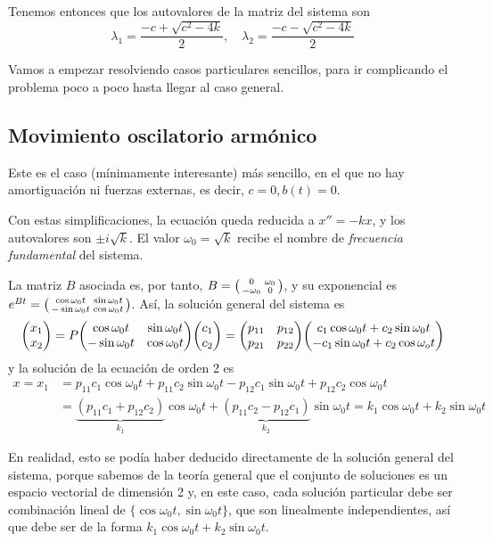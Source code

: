\documentclass[../ecuaciones_diferenciales.tex]{subfiles}
\begin{document}
Tenemos entonces que los autovalores de la matriz del sistema son
\[\lambda_1 = \frac{-c + \sqrt{c^2 - 4k}}{2}, \quad \lambda_2 = \frac{-c - \sqrt{c^2-4k}}{2}\]

Vamos a empezar resolviendo casos particulares sencillos, para ir complicando el
problema poco a poco hasta llegar al caso general.

\subsection{Movimiento oscilatorio armónico}
Este es el caso (mínimamente interesante) más sencillo, en el que no hay
amortiguación ni fuerzas externas, es decir, \(c = 0, b(t) = 0\).

Con estas simplificaciones, la ecuación queda reducida a \(x'' = -kx\), y los
autovalores son \(\pm i\sqrt{k}\). El valor \(\omega_0 = \sqrt{k}\) recibe el
nombre de \emph{frecuencia fundamental} del sistema.

La matriz \(B\) asociada es, por tanto, \(B = \smat{0 & \omega_0 \\ -\omega_0 &
	0}\), y su exponencial es \(e^{Bt} = \smat{\cos \omega_0 t & \sin \omega_0 t
	\\ -\sin \omega_0 t & \cos \omega_0 t}\). Así, la solución general del sistema
es
\[\mat{x_1 \\ x_2} = P \mat{\cos \omega_0 t & \sin \omega_0 t
		\\ -\sin \omega_0 t & \cos \omega_0 t}\mat{c_1 \\ c_2} = \mat{p_{11} & p_{12} \\
		p_{21} & p_{22}} \mat{c_1 \cos \omega_0 t + c_2 \sin \omega_0 t \\ -c_1 \sin
		\omega_0 t + c_2 \cos \omega_o t}\]
y la solución de la ecuación de orden 2 es
\begin{align*}
	x = x_1 & = p_{11}c_1 \cos \omega_0 t + p_{11}c_2 \sin \omega_0 t - p_{12}c_1
	\sin \omega_0 t + p_{12}c_2 \cos \omega_0 t                                   \\
	        & = \underbrace{(p_{11}c_1+p_{12}c_2)}_{k_1} \cos \omega_0 t +
	\underbrace{(p_{11}c_2 - p_{12}c_1)}_{k_2} \sin \omega_0 t = k_1 \cos \omega_0
	t + k_2 \sin \omega_0 t
\end{align*}

\begin{remark}
	En realidad, esto se podía haber deducido directamente de la solución general
	del sistema, porque sabemos de la teoría general que el conjunto de soluciones
	es un espacio vectorial de dimensión 2 y, en este caso, cada solución
	particular debe ser combinación lineal de
	\(\{\cos \omega_0 t, \sin \omega_0 t\}\), que son linealmente independientes,
	así que debe ser de la forma \(k_1 \cos \omega_0 t + k_2 \sin \omega_0 t\).
\end{remark}
\end{document}
